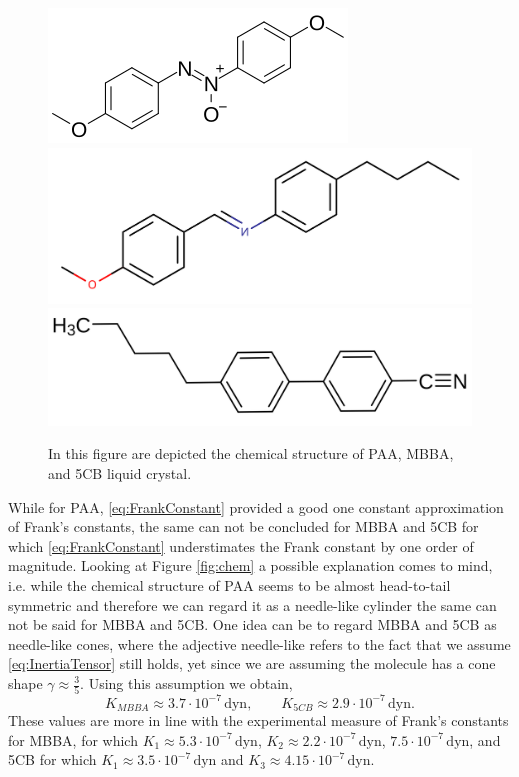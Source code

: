 \documentclass[%
 aip,
 amsmath,amssymb,
 reprint,%
]{revtex4-1}
\begin{document}
\begin{figure}
  \includegraphics[scale=0.4]{Figures/PAA}\\
  \includegraphics[scale=0.11]{Figures/MBBA}
  \includegraphics[scale=0.085]{Figures/5CB}
  \caption{In this figure are depicted the chemical structure of PAA, MBBA, and 5CB liquid crystal.}
\end{figure}

While for PAA, \eqref{eq:FrankConstant} provided a good one constant approximation of Frank's constants, the same can not be concluded for MBBA and 5CB for which \eqref{eq:FrankConstant} understimates the Frank constant by one order of magnitude.
Looking at Figure \ref{fig:chem} a possible explanation comes to mind, i.e. while the chemical structure of PAA seems to be almost head-to-tail symmetric and therefore we can regard it as a needle-like cylinder the same can not be said for MBBA and 5CB.
One idea can be to regard MBBA and 5CB as needle-like cones, where the adjective needle-like refers to the fact that we assume \eqref{eq:InertiaTensor} still holds, yet since we are assuming the molecule has a cone shape $\gamma\approx\frac{3}{5}$.
Using this assumption we obtain,
\begin{equation}
  K_{MBBA} \approx 3.7 \cdot 10^{-7}\,\text{dyn}, \qquad K_{5CB}\approx 2.9\cdot 10^{-7}\,\text{dyn}.
\end{equation}
These values are more in line with the experimental measure of Frank's constants for MBBA, for which $K_1 \approx 5.3 \cdot 10^{-7}\,\text{dyn}$, $K_2 \approx 2.2 \cdot 10^{-7}\,\text{dyn}$, $7.5\cdot 10^{-7}\, \text{dyn}$\cite{dGJ}, and 5CB for which $K_1\approx 3.5\cdot 10^{-7}\,\text{dyn}$ and $K_3\approx 4.15\cdot 10^{-7}\,\text{dyn}$\cite{BRBF85}.
\end{document}
